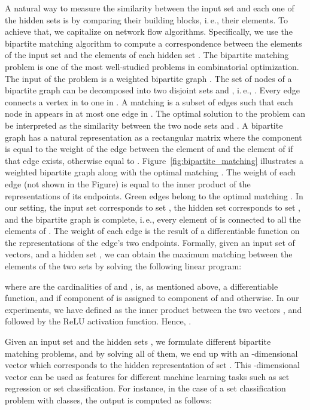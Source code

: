 \documentclass[twoside]{article}
\newcommand{\ie}{i.\,e., }
\begin{document}
A natural way to measure the similarity between the input set and each one of the hidden sets is by comparing their building blocks, \ie their elements.
To achieve that, we capitalize on network flow algorithms.
Specifically, we use the bipartite matching algorithm to compute a correspondence between the elements of the input set  and the elements of each hidden set .
The bipartite matching problem is one of the most well-studied problems in combinatorial optimization.
The input of the problem is a weighted bipartite graph .
The set of nodes  of a bipartite graph can be decomposed into two disjoint sets  and , \ie .
Every edge  connects a vertex in  to one in .
A matching  is a subset of edges such that each node in  appears in at most one edge in .
The optimal solution to the problem can be interpreted as the similarity between the two node sets  and .
A bipartite graph has a natural representation as a rectangular  matrix where the  component is equal to the weight of the edge between the  element of  and the  element of  if that edge exists, otherwise equal to .
Figure~\ref{fig:bipartite_matching} illustrates a weighted bipartite graph along with the optimal matching .
The weight of each edge (not shown in the Figure) is equal to the inner product of the representations of its endpoints.
Green edges belong to the optimal matching .
In our setting, the input set  corresponds to set , the hidden set  corresponds to set , and the bipartite graph is complete, \ie every element of  is connected to all the elements of .
The weight of each edge is the result of a differentiable function  on the representations of the edge's two endpoints.
Formally, given an input set of vectors,  and a hidden set , we can obtain the maximum matching between the elements of the two sets by solving the following linear program:

where  are the cardinalities of  and ,  is, as mentioned above, a differentiable function, and  if component  of  is assigned to component  of  and  otherwise.
In our experiments, we have defined  as the inner product between the two vectors , and  followed by the ReLU activation function.
Hence, .

Given an input set  and the  hidden sets , we formulate  different bipartite matching problems, and by solving all  of them, we end up with an -dimensional vector  which corresponds to the hidden representation of set .
This -dimensional vector can be used as features for different machine learning tasks such as set regression or set classification.
For instance, in the case of a set classification problem with  classes, the output is computed as follows:
\end{document}
